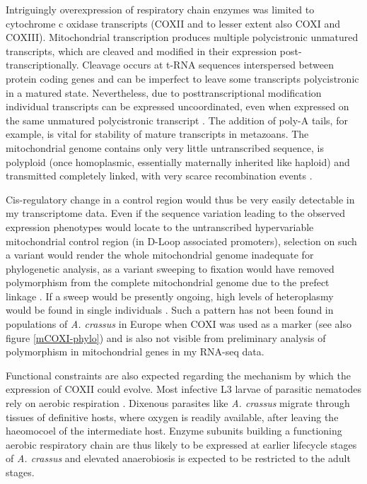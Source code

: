 Intriguingly overexpression of respiratory chain enzymes was limited
to cytochrome c oxidase transcripts (COXII and to lesser extent also
COXI and COXIII). Mitochondrial transcription produces multiple
polycistronic unmatured transcripts, which are cleaved and modified in
their expression post-transcriptionally. Cleavage occurs at t-RNA
sequences interspersed between protein coding genes and can be
imperfect to leave some transcripts polycistronic in a matured
state. Nevertheless, due to posttranscriptional modification
individual transcripts can be expressed uncoordinated, even when
expressed on the same unmatured polycistronic transcript
\cite{pmid19843606}. The addition of poly-A tails, for example, is
vital for stability of mature transcripts in metazoans. The
mitochondrial genome contains only very little untranscribed sequence,
is polyploid (once homoplasmic, essentially maternally inherited like
haploid) and transmitted completely linked, with very scarce
recombination events \cite{pmid18023115}.

Cis-regulatory change in a control region would thus be very easily
detectable in my transcriptome data. Even if the sequence variation
leading to the observed expression phenotypes would locate to the
untranscribed hypervariable mitochondrial control region (in D-Loop
associated promoters), selection on such a variant would render the
whole mitochondrial genome inadequate for phylogenetic analysis, as a
variant sweeping to fixation would have removed polymorphism from the
complete mitochondrial genome due to the prefect linkage
\cite{pmid19821901}. If a sweep would be presently ongoing, high
levels of heteroplasmy would be found in single individuals
\cite{pmid21226948}. Such a pattern has not been found in populations
of \textit{A. crassus} in Europe when COXI was used as a marker
\cite{wielgoss_population_2008, dl_py} (see also figure
\ref{mCOXI-phylo}) and is also not visible from preliminary analysis
of polymorphism in mitochondrial genes in my RNA-seq data.

Functional constraints are also expected regarding the mechanism by
which the expression of COXII could evolve. Most infective L3 larvae
of parasitic nematodes rely on aerobic respiration
\cite{kennedy2001parasitic}. Dixenous parasites like
\textit{A. crassus} migrate through tissues of definitive hosts, where
oxygen is readily available, after leaving the haeomocoel of the
intermediate host. Enzyme subunits building a functioning aerobic
respiratory chain are thus likely to be expressed at earlier lifecycle
stages of \textit{A. crassus} and elevated anaerobiosis is expected to
be restricted to the adult stages.

